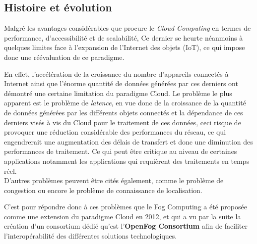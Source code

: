 \subsection{Histoire et évolution}
Malgré les avantages considérables que procure le \emph{\gls{Cloud Computing}} en termes de performance, d'accessibilité et de scalabilité, Ce dernier se heurte néanmoins à quelques limites face à l'expansion de l'Internet des objets (IoT), ce qui impose donc une réévaluation de ce paradigme. \par 
En effet, l'accélération de la croissance du nombre d'appareils connectés à Internet ainsi que l'énorme quantité de données générées par ces derniers ont démontré une certaine limitation du paradigme Cloud. Le problème le plus apparent est le problème de \emph{\gls{latence}}, en vue donc de la croissance de la quantité de données générées par les différents objets connectés et la dépendance de ces derniers visés à vis du Cloud pour le traitement de ces données, ceci risque de provoquer une réduction considérable des performances du réseau, ce qui engendrerait une augmentation des délais de transfert et donc une diminution des performances de traitement. Ce qui peut être critique au niveau de certaines applications notamment les applications qui requièrent des traitements en temps réel.\\
D'autres problèmes peuvent être cités également, comme le problème de congestion ou encore le problème de connaissance de localisation. \par
C'est pour répondre donc à ces problèmes que le Fog Computing a été proposée comme une extension du paradigme Cloud en 2012, et qui a vu par la suite la création d'un consortium dédié qu'est l'\textbf{OpenFog Consortium} afin de faciliter l'interopérabilité des différentes solutions technologiques.

